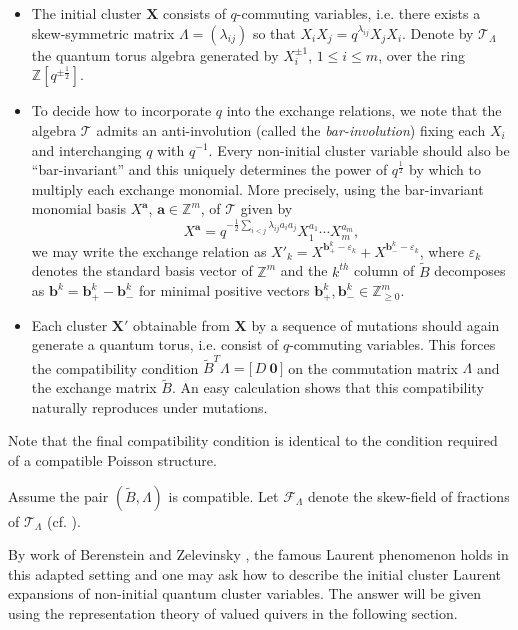 \documentclass[12pt]{amsart}
\newcommand{\bfa}{\mathbf{a}}
\newcommand{\bfb}{\mathbf{b}}
\newcommand{\bfX}{\mathbf{X}}
\newcommand{\cF}{\mathcal{F}}
\newcommand{\cT}{\mathcal{T}}
\newcommand{\half}{{\frac{1}{2}}}
\newcommand{\ZZ}{\mathbb{Z}}
\begin{document}
  \begin{itemize}
    \item The initial cluster $\bfX$ consists of $q$-commuting variables, i.e. there exists a skew-symmetric matrix $\Lambda=(\lambda_{ij})$ so that $X_iX_j=q^{\lambda_{ij}}X_jX_i$.  
    Denote by $\cT_\Lambda$ the quantum torus algebra generated by $X_i^{\pm1}$, $1\le i\le m$, over the ring $\ZZ[q^{\pm\half}]$.
    \item To decide how to incorporate $q$ into the exchange relations, we note that the algebra $\cT$ admits an anti-involution (called the \emph{bar-involution}) fixing each $X_i$ and interchanging $q$ with $q^{-1}$.
    Every non-initial cluster variable should also be ``bar-invariant'' and this uniquely determines the power of $q^\half$ by which to multiply each exchange monomial.  
    More precisely, using the bar-invariant monomial basis $X^\bfa$, $\bfa\in\ZZ^m$, of $\cT$ given by
    \[X^\bfa=q^{-\half\sum\limits_{i<j}\lambda_{ij}a_ia_j}X_1^{a_1}\cdots X_m^{a_m},\]
    we may write the exchange relation as $X'_k=X^{\bfb_+^k-\varepsilon_k}+X^{\bfb_-^k-\varepsilon_k}$, where $\varepsilon_k$ denotes the standard basis vector of $\ZZ^m$ and the $k^{th}$ column of $\tilde B$ decomposes as $\bfb^k=\bfb^k_+-\bfb^k_-$ for minimal positive vectors $\bfb^k_+,\bfb^k_-\in\ZZ_{\ge0}^m$.
    \item Each cluster $\bfX'$ obtainable from $\bfX$ by a sequence of mutations should again generate a quantum torus, i.e. consist of $q$-commuting variables.
      This forces the compatibility condition $\tilde B^T\Lambda=\big[\,D\ \boldsymbol{0}\,\big]$ on the commutation matrix $\Lambda$ and the exchange matrix $\tilde B$.
    An easy calculation shows that this compatibility naturally reproduces under mutations.
  \end{itemize}
  Note that the final compatibility condition is identical to the condition required of a compatible Poisson structure.
  
  Assume the pair $(\tilde B,\Lambda)$ is compatible.
  Let $\cF_\Lambda$ denote the skew-field of fractions of $\cT_\Lambda$ (cf. \cite{berenstein-zelevinsky}).


  By work of Berenstein and Zelevinsky \cite{berenstein-zelevinsky}, the famous Laurent phenomenon holds in this adapted setting and one may ask how to describe the initial cluster Laurent expansions of non-initial quantum cluster variables.  
  The answer will be given using the representation theory of valued quivers in the following section.
\end{document}
